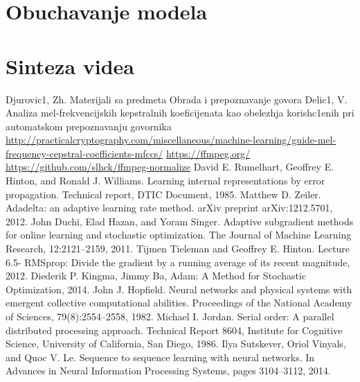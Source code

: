 \documentclass[a4paper, openany, oneside, 11pt]{book}
\begin{document}
\chapter{Obuchavanje modela}

\chapter{Sinteza videa}


\begin{thebibliography}{99}

Djurovic1, Zh. Materijali sa predmeta Obrada i prepoznavanje govora
Delic1, V. Analiza mel-frekvencijskih kepstralnih koeficijenata kao obelezhja korish\-c1enih pri automat\-skom prepoznavanju govornika
\selectfont
\url{http://practicalcryptography.com/miscellaneous/machine-learning/guide-mel-frequency-cepstral-coefficients-mfccs/}
\url{https://ffmpeg.org/}
\url{https://github.com/slhck/ffmpeg-normalize}
David E. Rumelhart, Geoffrey E. Hinton, and Ronald J. Williams. Learning
internal representations by error propagation. Technical report, DTIC Document, 1985.
Matthew D. Zeiler. Adadelta: an adaptive learning rate method. arXiv preprint arXiv:1212.5701, 2012.
John Duchi, Elad Hazan, and Yoram Singer. Adaptive subgradient methods for
online learning and stochastic optimization. The Journal of Machine Learning Research, 12:2121–2159, 2011.
Tijmen Tieleman and Geoffrey E. Hinton. Lecture 6.5- RMSprop: Divide
the gradient by a running average of its recent magnitude, 2012.
Diederik P. Kingma, Jimmy Ba, Adam: A Method for Stochastic Optimization, 2014.
John J. Hopfield. Neural networks and physical systems with emergent collective
computational abilities. Proceedings of the National Academy of Sciences, 79(8):2554–2558, 1982.
Michael I. Jordan. Serial order: A parallel distributed processing approach.
Technical Report 8604, Institute for Cognitive Science, University of California, San Diego, 1986.
Ilya Sutskever, Oriol Vinyals, and Quoc V. Le. Sequence to sequence learning
with neural networks. In Advances in Neural Information Processing Systems,
pages 3104–3112, 2014.



\end{thebibliography}
\end{document}
